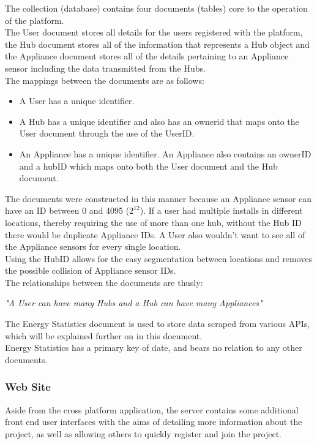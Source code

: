 \documentclass[draft,preprint,12pt,3p]{elsarticle}
\begin{document}
The collection (database) contains four documents (tables) core to the operation of the platform.\\
The User document stores all details for the users registered with the platform, the Hub document stores all of the information that represents a Hub object and the Appliance document stores all of the details pertaining to an Appliance sensor including the data transmitted from the Hubs.\\
The mappings between the documents are as follows:
\begin{itemize}
\item A User has a unique identifier.
\item A Hub has a unique identifier and also has an ownerid that maps onto the User document through the use of the UserID.
\item An Appliance has a unique identifier. An Appliance also contains an ownerID and a hubID which maps onto both the User document and the Hub document.
\end{itemize}
The documents were constructed in this manner because an Appliance sensor can have an ID between 0 and 4095 ($2^{12}$). If a user had multiple installs in different locations, thereby requiring the use of more than one hub, without the Hub ID there would be duplicate Appliance IDs. A User also wouldn't want to see all of the Appliance sensors for every single location.\\ 
Using the HubID allows for the easy segmentation between locations and removes the possible collision of Appliance sensor IDs.\\

The relationships between the documents are thusly:
\begin{center}
    \textit{"A User can have many Hubs and a Hub can have many Appliances"}
\end{center}
The Energy Statistics document is used to store data scraped from various APIs, which will be explained further on in this document.\\
Energy Statistics has a primary key of date, and bears no relation to any other documents. 

\subsubsection{Web Site}
Aside from the cross platform application, the server contains some additional front end user interfaces with the aims of detailing more information about the project, as well as allowing others to quickly register and join the project.\\
\end{document}
